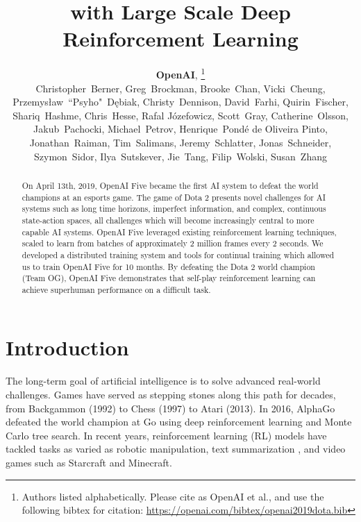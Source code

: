 \documentclass[11pt]{article}
\title{\dota with Large Scale Deep Reinforcement Learning}
\author{
 \parbox{\linewidth}{
 \centering
 \textbf{OpenAI},
\footnote{
Authors listed alphabetically. Please cite as
OpenAI et al., and use the following bibtex for citation: \url{https://openai.com/bibtex/openai2019dota.bib}
}
\\ 
 Christopher~Berner, Greg~Brockman, Brooke~Chan, Vicki~Cheung, Przemys\l{}aw~``Psyho"~D\k{e}biak, Christy~Dennison, David~Farhi, Quirin~Fischer, Shariq~Hashme, Chris~Hesse, Rafal J\'{o}zefowicz, Scott~Gray, Catherine~Olsson, Jakub~Pachocki, Michael~Petrov, Henrique~Pond\'e de Oliveira Pinto, Jonathan~Raiman, Tim~Salimans, Jeremy~Schlatter, Jonas~Schneider, Szymon~Sidor, Ilya~Sutskever, Jie~Tang, Filip~Wolski, Susan~Zhang
 }
}
\newcommand{\dota}{Dota 2\xspace}
\newcommand{\openaifive}{OpenAI Five\xspace}
\begin{document}
\doparttoc %
\faketableofcontents %

\maketitle

\begin{abstract}
On April 13th, 2019, \openaifive became the first AI system to defeat the world champions at an esports game.
The game of \dota presents novel challenges for AI systems such as long time horizons, imperfect information, and complex, continuous state-action spaces, all challenges which will become increasingly central to more capable AI systems.
\openaifive leveraged existing reinforcement learning techniques, scaled to learn from batches of approximately 2 million frames every 2 seconds. 
We developed a distributed training system and tools for continual training which allowed us to train \openaifive for 10 months.
By defeating the \dota world champion (Team OG), \openaifive demonstrates that self-play reinforcement learning can achieve superhuman performance on a difficult task.
\end{abstract}

\section{Introduction}

The long-term goal of artificial intelligence is to solve advanced real-world challenges. 
Games have served as stepping stones along this path for decades, from Backgammon (1992) to Chess (1997) to Atari (2013)\cite{tesauro1994td, campbell2002deepblue, mnih2013playing}.
In 2016, AlphaGo defeated the world champion at Go using deep reinforcement learning and Monte Carlo tree search\cite{silver2016mastering}. 
In recent years, reinforcement learning (RL) models have tackled tasks as varied as robotic manipulation\cite{dactyl}, text summarization \cite{paulus2017deep}, and video games such as Starcraft\cite{alphastarblog} and Minecraft\cite{guss2019minerl}.
\end{document}
